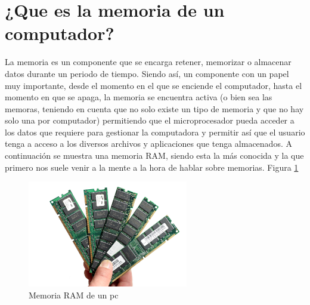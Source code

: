 \documentclass{article}
\begin{document}
\section{¿Que es la memoria de un computador?} \label{contenido}
La memoria es un componente que se encarga retener, memorizar o almacenar datos durante un periodo de tiempo.\cite{definicion}
Siendo así, un componente con un papel muy importante, desde el momento en el que se enciende el computador, hasta el momento en que se apaga, la memoria se encuentra activa (o bien sea las memoras, teniendo en cuenta que no solo existe un tipo de memoria y que no hay solo una por computador) permitiendo que el microprocesador pueda acceder a los datos que requiere para gestionar la computadora y permitir así que el usuario tenga a acceso a los diversos archivos y aplicaciones que tenga almacenados. A continuación se muestra una memoria RAM, siendo esta la más conocida y la que primero nos suele venir a la mente a la hora de hablar sobre memorias. Figura \ref{fig:memoriapc}

\begin{figure}[h]
\includegraphics[width=7cm]{Memoria.jpg}
\centering
\caption{Memoria RAM de un pc}
\label{fig:memoriapc}
\end{figure}
\end{document}
